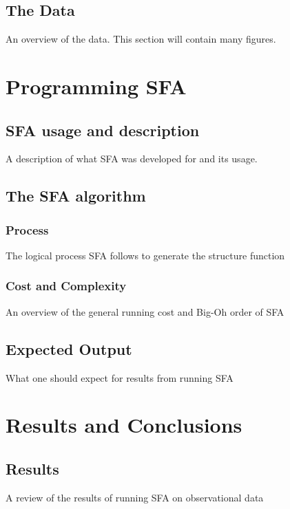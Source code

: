 \documentclass[12pt, oneside]{smuthesis}
\begin{document}
\section{\sc The Data}

An overview of the data. This section will contain many figures.

\chapter{\sc Programming SFA}

\section{\sc SFA usage and description}

A description of what SFA was developed for and its usage.

\section{\sc The SFA algorithm}

\subsection{\sc Process}

The logical process SFA follows to generate the structure function

\subsection{\sc Cost and Complexity}

An overview of the general running cost and Big-Oh order of SFA

\section{\sc Expected Output}

What one should expect for results from running SFA

\chapter{\sc Results and Conclusions}

\section{\sc Results}

A review of the results of running SFA on observational data
\end{document}
